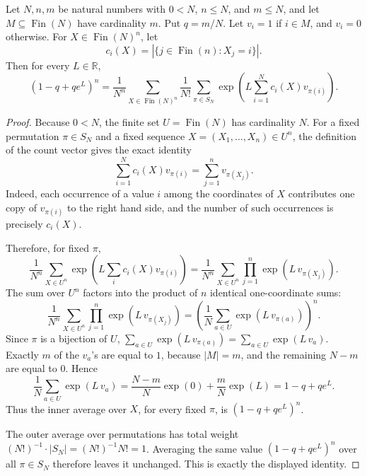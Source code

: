 \begin{helper}
Let \(N,n,m\) be natural numbers with \(0<N\), \(n\le N\), and
\(m\le N\), and let \(M\subseteq \operatorname{Fin}(N)\) have cardinality
\(m\).  Put \(q=m/N\).  Let \(v_i=1\) if \(i\in M\), and \(v_i=0\)
otherwise.  For \(X\in \operatorname{Fin}(N)^n\), let
\[
c_i(X)=|\{j\in \operatorname{Fin}(n):X_j=i\}|.
\]
Then for every \(L\in\mathbb R\),
\[
(1-q+q e^L)^n
=\frac{1}{N^n}\sum_{X\in \operatorname{Fin}(N)^n}
  \frac{1}{N!}\sum_{\pi\in S_N}
  \exp\!\left(L\sum_{i=1}^N c_i(X)v_{\pi(i)}\right).
\]
\end{helper}
\begin{proof}
Because \(0<N\), the finite set \(U=\operatorname{Fin}(N)\) has
cardinality \(N\).  For a fixed permutation \(\pi\in S_N\) and a fixed
sequence \(X=(X_1,\ldots,X_n)\in U^n\), the definition of the count vector
gives the exact identity
\[
\sum_{i=1}^N c_i(X)v_{\pi(i)}
 =\sum_{j=1}^n v_{\pi(X_j)}.
\]
Indeed, each occurrence of a value \(i\) among the coordinates of \(X\)
contributes one copy of \(v_{\pi(i)}\) to the right hand side, and the
number of such occurrences is precisely \(c_i(X)\).

Therefore, for fixed \(\pi\),
\[
\frac{1}{N^n}\sum_{X\in U^n}
  \exp\!\left(L\sum_i c_i(X)v_{\pi(i)}\right)
=
\frac{1}{N^n}\sum_{X\in U^n}
  \prod_{j=1}^n \exp\!\left(L\,v_{\pi(X_j)}\right).
\]
The sum over \(U^n\) factors into the product of \(n\) identical one-coordinate
sums:
\[
\frac{1}{N^n}\sum_{X\in U^n}\prod_{j=1}^n
\exp\!\left(L\,v_{\pi(X_j)}\right)
=
\left(\frac1N\sum_{a\in U}\exp(L\,v_{\pi(a)})\right)^n .
\]
Since \(\pi\) is a bijection of \(U\),
\(\sum_{a\in U}\exp(L\,v_{\pi(a)})=\sum_{a\in U}\exp(L\,v_a)\).
Exactly \(m\) of the \(v_a\)'s are equal to \(1\), because
\(|M|=m\), and the remaining \(N-m\) are equal to \(0\).  Hence
\[
\frac1N\sum_{a\in U}\exp(L\,v_a)
=\frac{N-m}{N}\exp(0)+\frac{m}{N}\exp(L)
=1-q+q e^L .
\]
Thus the inner average over \(X\), for every fixed \(\pi\), is
\((1-q+q e^L)^n\).

The outer average over permutations has total weight
\((N!)^{-1}\cdot |S_N|=(N!)^{-1}N!=1\).  Averaging the same value
\((1-q+q e^L)^n\) over all \(\pi\in S_N\) therefore leaves it unchanged.
This is exactly the displayed identity.
\end{proof}
